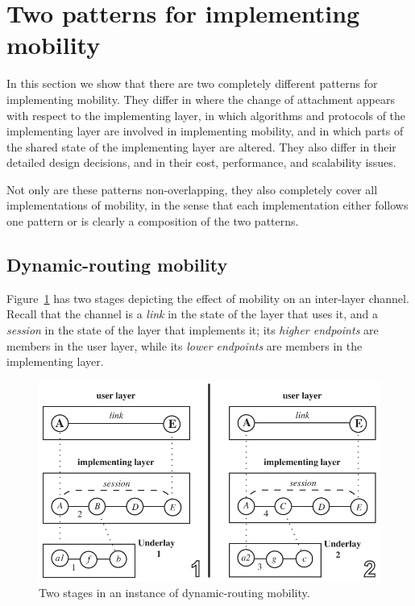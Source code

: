 \section{Two patterns for implementing mobility}
\label{sec:sec3}

In this section we show that there are two completely different patterns
for implementing mobility.
They differ in where the change of attachment appears with respect to the
implementing layer,
in which algorithms and protocols of the implementing layer 
are involved in implementing mobility, and in which parts of the
shared state of the implementing layer are altered.
They also differ
in their detailed design
decisions, and in their cost, performance, and scalability issues.

Not only are these patterns non-overlapping, they also completely
cover all implementations of mobility, in the sense that each
implementation either follows one pattern or is clearly a composition
of the two patterns.

\subsection{Dynamic-routing mobility}
\label{sec:drm}

Figure~\ref{fig:drm} has two stages depicting the effect of mobility
on an inter-layer channel.
Recall that the channel is a {\it link}
in the state of the layer that uses it, and a {\it session} in the
state of the layer that implements it; its {\it higher endpoints}
are members in the user layer, while its {\it lower endpoints} are
members in
the implementing layer.

\begin{figure}
\centering
\includegraphics[scale=0.95]{figures/drm.pdf}
\caption{Two stages in an instance of dynamic-routing mobility.}
\label{fig:drm}
\end{figure}

